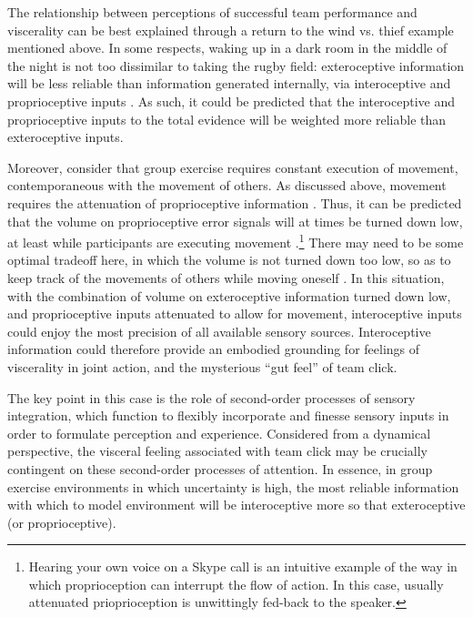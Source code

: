 \begin{CJK}{UTF8}{gbsn}

The relationship between perceptions of successful team performance and viscerality can be best explained through a return to the wind vs. thief example mentioned above.  In some respects, waking up in a dark room in the middle of the night is not too dissimilar to taking the rugby field: exteroceptive information will be less reliable than information generated internally, via interoceptive and proprioceptive inputs \citep{Pezzulo2014}. As such, it could be predicted that the interoceptive and proprioceptive inputs to the total evidence will be weighted more reliable than exteroceptive inputs.

Moreover, consider that group exercise requires constant execution of movement, contemporaneous with the movement of others. As discussed above, movement requires the attenuation of proprioceptive information \citep[so as not to interrupt the flow of movement itself, see][]{Dietrich2004a}.  Thus, it can be predicted that the volume on proprioceptive error signals will at times be turned down low, at least while participants are executing movement \citep{Friston2015}.\footnote{Hearing your own voice on a Skype call is an intuitive example of the way in which proprioception can interrupt the flow of action. In this case, usually attenuated prioprioception is unwittingly fed-back to the speaker.}  There may need to be some optimal tradeoff here, in which the volume is not turned down too low, so as to keep track of the movements of others while moving oneself \citep{Pesquita2017}.  In this situation, with the combination of volume on exteroceptive information turned down low, and proprioceptive inputs attenuated to allow for movement, interoceptive inputs could enjoy the most precision of all available sensory sources.  Interoceptive information could therefore provide an embodied grounding for feelings of viscerality in joint action, and the mysterious ``gut feel'' of team click.

The key point in this case is the role of second-order processes of sensory integration, which function to flexibly incorporate and finesse sensory inputs in order to formulate perception and experience.  Considered from a dynamical perspective, the visceral feeling associated with team click may be crucially contingent on these second-order processes of attention.  In essence, in group exercise environments in which uncertainty is high, the most reliable information with which to model environment will be interoceptive more so that exteroceptive (or proprioceptive).


\end{CJK}
